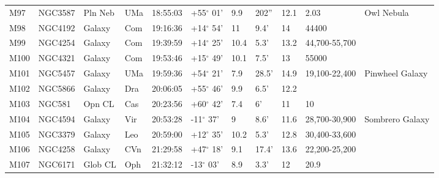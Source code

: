 \begin{longtable}{@{}lllllllllll@{}}
M97        & NGC3587     & Pln Neb    & UMa       & 18:55:03 & +55$^{\circ}$ 01'  & 9.9       & 202''                & 12.1     & 2.03                & Owl Nebula                                \\
M98        & NGC4192     & Galaxy     & Com       & 19:16:36 & +14$^{\circ}$ 54'  & 11        & 9.4'                 & 14       & 44400               &                                           \\
M99        & NGC4254     & Galaxy     & Com       & 19:39:59 & +14$^{\circ}$ 25'  & 10.4      & 5.3'                 & 13.2     & 44,700-55,700       &                                           \\
M100       & NGC4321     & Galaxy     & Com       & 19:53:46 & +15$^{\circ}$ 49'  & 10.1      & 7.5'                 & 13       & 55000               &                                           \\
M101       & NGC5457     & Galaxy     & UMa       & 19:59:36 & +54$^{\circ}$ 21'  & 7.9       & 28.5'                & 14.9     & 19,100-22,400       & Pinwheel Galaxy                           \\
M102       & NGC5866     & Galaxy     & Dra       & 20:06:05 & +55$^{\circ}$ 46'  & 9.9       & 6.5'                 & 12.2     &                     &                                           \\
M103       & NGC581      & Opn CL     & Cas       & 20:23:56 & +60$^{\circ}$ 42'  & 7.4       & 6'                   & 11       & 10                  &                                           \\
M104       & NGC4594     & Galaxy     & Vir       & 20:53:28 & -11$^{\circ}$ 37'  & 9         & 8.6'                 & 11.6     & 28,700-30,900       & Sombrero Galaxy                           \\
M105       & NGC3379     & Galaxy     & Leo       & 20:59:00 & +12$^{\circ}$ 35'  & 10.2      & 5.3'                 & 12.8     & 30,400-33,600       &                                           \\
M106       & NGC4258     & Galaxy     & CVn       & 21:29:58 & +47$^{\circ}$ 18'  & 9.1       & 17.4'                & 13.6     & 22,200-25,200       &                                           \\
M107       & NGC6171     & Glob CL    & Oph       & 21:32:12 & -13$^{\circ}$ 03'  & 8.9       & 3.3'                 & 12       & 20.9                &                                           \\

\end{longtable}

